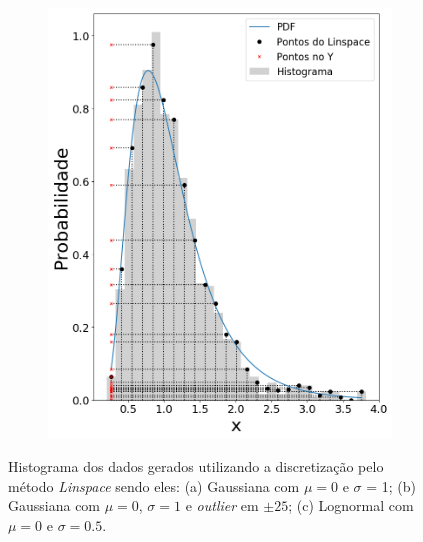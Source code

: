 \begin{figure}[H]
\begin{subfigure}[b]{0.3\textwidth}
		\includegraphics[width=\linewidth]{./figuras/lognormal_05_0}
		\caption{}
		\label{fig:randloglin}
	\end{subfigure}
	
	\caption{Histograma dos dados gerados utilizando a discretização pelo método \textit{Linspace} sendo eles: (a) Gaussiana com $\mu = 0$ e $\sigma$ = 1; (b) Gaussiana com $\mu = 0$, $\sigma = 1$ e \textit{outlier} em $\pm 25$; (c) Lognormal com $\mu = 0$ e $\sigma = 0.5$.}
	\label{fig:datalin}
\end{figure}


